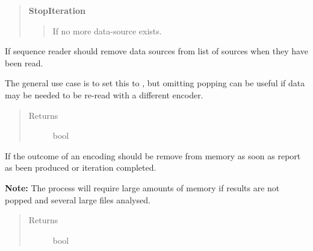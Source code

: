 \documentclass[letterpaper,10pt,english]{sphinxmanual}
\begin{document}
\begin{fulllineitems}
\begin{fulllineitems}
\begin{quote}
\begin{description}
\textbf{StopIteration}
\begin{quote}

If no more data-source exists.
\end{quote}

\end{description}\end{quote}

\end{fulllineitems}


\begin{fulllineitems}
\label{fseq.reading:fseq.reading.seq_reader.SeqReader.popDataSources}
If sequence reader should remove data sources from list of sources
when they have been read.

The general use case is to set this to , but omitting popping
can be useful if data may be needed to be re-read with a different
encoder.
\begin{quote}\begin{description}
\item[{Returns}] \leavevmode
bool

\end{description}\end{quote}

\end{fulllineitems}


\begin{fulllineitems}
\label{fseq.reading:fseq.reading.seq_reader.SeqReader.popEncodingResults}
If the outcome of an encoding should be remove from memory as soon
as report as been produced or iteration completed.

\textbf{Note:} The process will require large amounts of memory if results
are not popped and several large files analysed.
\begin{quote}\begin{description}
\item[{Returns}] \leavevmode
bool

\end{description}\end{quote}

\end{fulllineitems}


\end{fulllineitems}
\end{document}
